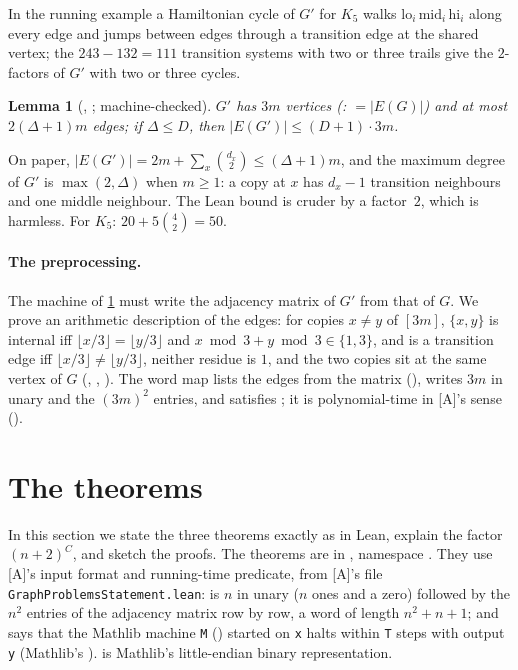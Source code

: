 \documentclass[10pt]{amsart}
\theoremstyle{plain}
\newtheorem{lemma}[theorem]{Lemma}
\theoremstyle{definition}
\theoremstyle{remark}
\numberwithin{equation}{section}
\newcommand{\A}{\textup{[A]}}
\begin{document}
\noindent In the running example a Hamiltonian cycle of $G'$ for $K_5$ walks
$\mathrm{lo}_i\,\mathrm{mid}_i\,\mathrm{hi}_i$ along every edge and jumps between edges through a
transition edge at the shared vertex; the $243-132=111$ transition systems with two or three trails
give the $2$-factors of $G'$ with two or three cycles.

\begin{lemma}[, ; machine-checked]\label{lem:size}
$G'$ has $3m$ vertices (:  $=|E(G)|$) and at most
$2(\Delta+1)m$ edges; if $\Delta\le D$, then $|E(G')|\le(D+1)\cdot3m$.
\end{lemma}

\noindent On paper, $|E(G')|=2m+\sum_x\binom{d_x}{2}\le(\Delta+1)m$, and the maximum degree of $G'$
is $\max(2,\Delta)$ when $m\ge1$: a copy at $x$ has $d_x-1$ transition neighbours and one middle
neighbour. The Lean bound is cruder by a factor~$2$, which is harmless. For $K_5$:
$20+5\binom42=50$.

\paragraph{The preprocessing.} The machine of \cref{sec:theorems} must write the adjacency matrix of
$G'$ from that of $G$. We prove an arithmetic description of the edges: for copies $x\ne y$ of $[3m]$,
$\{x,y\}$ is internal iff $\lfloor x/3\rfloor=\lfloor y/3\rfloor$ and $x\bmod3+y\bmod3\in\{1,3\}$, and is
a transition edge iff $\lfloor x/3\rfloor\ne\lfloor y/3\rfloor$, neither residue is $1$, and the two
copies sit at the same vertex of $G$ (, ,
). The word map  lists the edges from the matrix
(), writes $3m$ in unary and the $(3m)^2$ entries, and satisfies
; it is polynomial-time in \A's sense
().

\section{The theorems}\label{sec:theorems}

In this section we state the three theorems exactly as in Lean, explain the factor $(n+2)^C$, and
sketch the proofs. The theorems are in
, namespace
. They use \A's input format and running-time predicate, from \A's file
\texttt{GraphProblemsStatement.lean}:  is $n$ in unary ($n$ ones and a
zero) followed by the $n^2$ entries of the adjacency matrix row by row, a word of length $n^2+n+1$;
and  says that the Mathlib machine \texttt{M}
() started on \texttt{x} halts within \texttt{T} steps with output
\texttt{y} (Mathlib's ).  is Mathlib's little-endian binary
representation.
\end{document}
